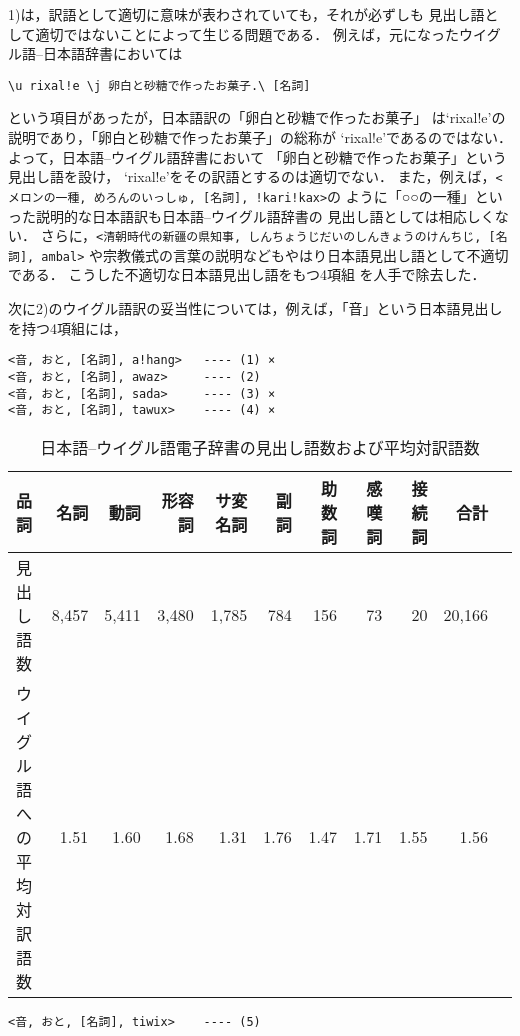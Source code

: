 {1)は，訳語として適切に意味が表わされていても，それが必ずしも
見出し語として適切ではないことによって生じる問題である．
例えば，元になったウイグル語--日本語辞書においては
\begin{center}
\verb+\u rixal!e \j 卵白と砂糖で作ったお菓子.\ [名詞]+
\end{center}
という項目があったが，日本語訳の「卵白と砂糖で作ったお菓子」
は`rixal!e'の説明であり，「卵白と砂糖で作ったお菓子」の総称が
`rixal!e'であるのではない．
よって，日本語--ウイグル語辞書において
「卵白と砂糖で作ったお菓子」という見出し語を設け，
`rixal!e'をその訳語とするのは適切でない．
また，例えば，\verb+<メロンの一種, めろんのいっしゅ, [名詞], !kari!kax>+の
ように「○○の一種」といった説明的な日本語訳も日本語--ウイグル語辞書の
見出し語としては相応しくない．
さらに，\verb+<清朝時代の新疆の県知事, しんちょうじだいのしんきょうのけんちじ, [名詞], ambal>+
や宗教儀式の言葉の説明などもやはり日本語見出し語として不適切である．
こうした不適切な日本語見出し語をもつ4項組
を人手で除去した．

次に2)のウイグル語訳の妥当性については，例えば，「音」という日本語見出しを持つ4項組には，
\begin{verbatim}
<音, おと, [名詞], a!hang>   ---- (1) ×
<音, おと, [名詞], awaz>     ---- (2) 
<音, おと, [名詞], sada>     ---- (3) ×
<音, おと, [名詞], tawux>    ---- (4) ×
\end{verbatim}

\begin{table}
\begin{center}
\caption{日本語--ウイグル語電子辞書の見出し語数および平均対訳語数}
\label{mytab:juwtab}
\footnotesize
\begin{tabular}{|l||r|r|r|r|r|r|r|r|r|r}
\hline
品詞 & 名詞 & 動詞 & 形容詞 & サ変名詞 & 副詞 & 助数詞 & 感嘆詞 & 接続詞 & 合計\\
\hline
見出し語数 & 8,457 & 5,411 & 3,480 & 1,785 & 784 & 156 & 73 & 20 & 20,166\\
\hline
\parbox[c]{8zw}{ウイグル語への\\平均対訳語数} & 1.51 & 1.60 & 1.68 & 1.31 & 
1.76 & 1.47 & 1.71 & 1.55 & 1.56 \\
\hline
\end{tabular}
\end{center}
\end{table}


\begin{verbatim}
<音, おと, [名詞], tiwix>    ---- (5) 	
\end{verbatim}

}
